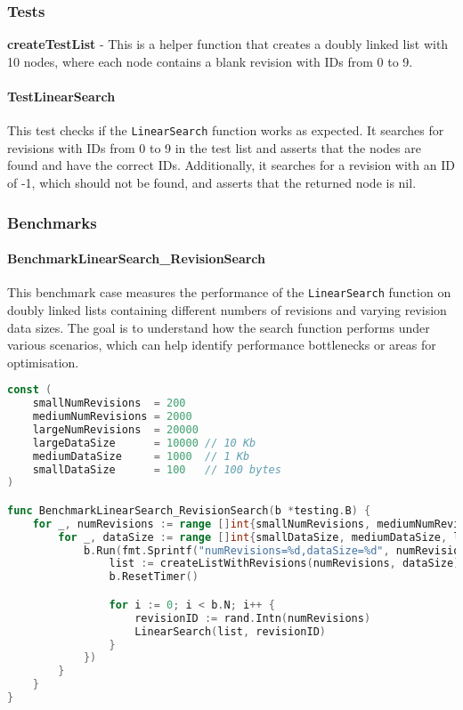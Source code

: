 \subsubsection{Tests}

\textbf{createTestList} - This is a helper function that creates a doubly linked list with 10 nodes, where each node contains a blank revision with IDs from 0 to 9.

\paragraph{TestLinearSearch}
This test checks if the \lstinline{LinearSearch} function works as expected. It searches for revisions with IDs from 0 to 9 in the test list and asserts that the nodes are found and have the correct IDs. Additionally, it searches for a revision with an ID of -1, which should not be found, and asserts that the returned node is nil.

\subsubsection{Benchmarks}

\paragraph{BenchmarkLinearSearch\_RevisionSearch}
This benchmark case measures the performance of the \lstinline{LinearSearch} function on doubly linked lists containing different numbers of revisions and varying revision data sizes. The goal is to understand how the search function performs under various scenarios, which can help identify performance bottlenecks or areas for optimisation.

\begin{lstlisting}[language=go]
const (
	smallNumRevisions  = 200
	mediumNumRevisions = 2000
	largeNumRevisions  = 20000
	largeDataSize      = 10000 // 10 Kb
	mediumDataSize     = 1000  // 1 Kb
	smallDataSize      = 100   // 100 bytes
)

func BenchmarkLinearSearch_RevisionSearch(b *testing.B) {
	for _, numRevisions := range []int{smallNumRevisions, mediumNumRevisions, largeNumRevisions} {
		for _, dataSize := range []int{smallDataSize, mediumDataSize, largeDataSize} {
			b.Run(fmt.Sprintf("numRevisions=%d,dataSize=%d", numRevisions, dataSize), func(b *testing.B) {
				list := createListWithRevisions(numRevisions, dataSize)
				b.ResetTimer()

				for i := 0; i < b.N; i++ {
					revisionID := rand.Intn(numRevisions)
					LinearSearch(list, revisionID)
				}
			})
		}
	}
}
\end{lstlisting}
\medskip

